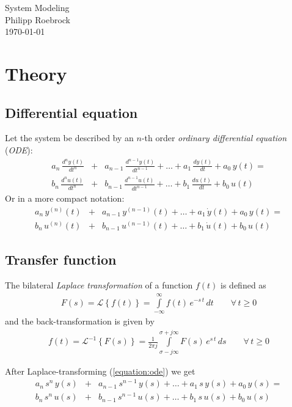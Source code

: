 \documentclass[a4paper,12pt]{article}
\newcommand{\Section}[2]{\section{#2}\label{section:#1}}
\newcommand{\SubSection}[2]{\subsection{#2}\label{subsection:#1}}
\newcommand{\ELabel}[1]{\label{equation:#1}}
\newcommand{\ERef}[1]{(\ref{equation:#1})}
\begin{document}
\vspace{1.5cm}
\begin{center}
{\Huge System Modeling}\\[3ex]
Philipp Roebrock\\[1ex]
\today\\
\end{center}
\vspace{1cm}






\Section{theory}{Theory}


\SubSection{diffeq}{Differential equation}

Let the system be described by an $n$-th order {\em ordinary differential equation} ({\em ODE}):
\begin{eqnarray}
a_{n}\,\frac{d^{n}y(t)}{dt^{n}}&+&a_{n-1}\,\frac{d^{n-1}y(t)}{dt^{n-1}}+\ldots+a_{1}\,\frac{dy(t)}{dt}+a_{0}\,y(t)=\nonumber\\
b_{n}\,\frac{d^{n}u(t)}{dt^{n}}&+&b_{n-1}\,\frac{d^{n-1}u(t)}{dt^{n-1}}+\ldots+b_{1}\,\frac{du(t)}{dt}+b_{0}\,u(t)
\end{eqnarray}
Or in a more compact notation:
\begin{eqnarray}
\ELabel{ode}
a_{n}\,y^{(n)}(t)&+&a_{n-1}\,y^{(n-1)}(t)+\ldots+a_{1}\,\dot{y}(t)+a_{0}\,y(t)=\nonumber\\
b_{n}\,u^{(n)}(t)&+&b_{n-1}\,u^{(n-1)}(t)+\ldots+b_{1}\,\dot{u}(t)+b_{0}\,u(t)
\end{eqnarray}

\SubSection{xferfunc}{Transfer function}

The bilateral {\em Laplace transformation} of a function $f(t)$ is defined as
\begin{eqnarray}
F(s)=\mathcal{L}\left\{f(t)\right\}=\int\limits_{-\infty}^{\infty}f(t)\,e^{-s\,t}\,dt\qquad\forall\,t\geq0
\end{eqnarray}
and the back-transformation is given by
\begin{eqnarray}
f(t)=\mathcal{L}^{-1}\left\{F(s)\right\}=\frac{1}{2\pi j}\int\limits_{\sigma-j\infty}^{\sigma+j\infty}F(s)\,e^{s\,t}\,ds\qquad\forall\,t\geq0
\end{eqnarray}

After Laplace-transforming \ERef{ode} we get
\begin{eqnarray}
\ELabel{xfer}
a_{n}\,s^{n}\,y(s)&+&a_{n-1}\,s^{n-1}\,y(s)+\ldots+a_{1}\,s\,y(s)+a_{0}\,y(s)=\nonumber\\
b_{n}\,s^{n}\,u(s)&+&b_{n-1}\,s^{n-1}\,u(s)+\ldots+b_{1}\,s\,u(s)+b_{0}\,u(s)
\end{eqnarray}
\end{document}
